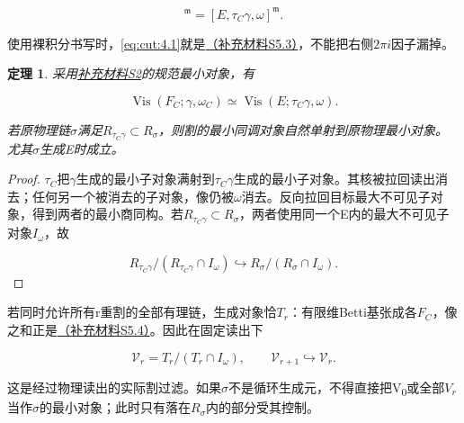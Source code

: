 \documentclass[11pt,a4paper,oneside]{ctexart}
\theoremstyle{cnplain}
\newtheorem{theorem}{定理}[section]
\theoremstyle{definition}
\theoremstyle{remark}
\numberwithin{equation}{section}
\newcommand{\otherref}[2]{\href{#1.pdf}{#2}}
\begin{document}
\begin{equation}
[F_C,\gamma,\omega_C]^{\mathfrak m}
       =[E,\tau_C\gamma,\omega]^{\mathfrak m}.         \label{eq:cut:4.1}
\end{equation}

使用裸积分书写时，\eqref{eq:cut:4.1}就是\otherref{feynman_periods_supplement}{（补充材料S5.3）}，不能把右侧\(2\pi i\)因子漏掉。

\begin{theorem}

\label{thm:cut:4.1} 采用\otherref{feynman_periods_supplement}{补充材料S2}的规范最小对象，有

\begin{equation}
\operatorname{Vis}(F_C;\gamma,\omega_C)
     \simeq\operatorname{Vis}(E;\tau_C\gamma,\omega).  \label{eq:cut:4.2}
\end{equation}

若原物理链\(\sigma \)满足\(R_{\tau _C\gamma }\subset R_\sigma \)，则割的最小同调对象自然单射到原物理最小对象。尤其\(\sigma \)生成E时成立。

\end{theorem}

\begin{proof}

\(\tau _C\)把\(\gamma \)生成的最小子对象满射到\(\tau _C\gamma \)生成的最小子对象。其核被拉回读出消去；任何另一个被消去的子对象，像仍被\(\omega \)消去。反向拉回目标最大不可见子对象，得到两者的最小商同构。若\(R_{\tau _C\gamma }\subset R_\sigma \)，两者使用同一个E内的最大不可见子对象\(I_\omega \)，故

\begin{equation}
R_{\tau _C\gamma }/(R_{\tau _C\gamma }\cap I_\omega)
       \hookrightarrow R_\sigma/(R_\sigma\cap I_\omega).
\end{equation}

\end{proof}

若同时允许所有r重割的全部有理链，生成对象恰\(T_r\)：有限维Betti基张成各\(F_C\)，像之和正是\otherref{feynman_periods_supplement}{（补充材料S5.4）}。因此在固定读出下

\begin{equation}
\mathcal V_r=T_r/(T_r\cap I_\omega),\qquad
 \mathcal V_{r+1}\hookrightarrow\mathcal V_r.          \label{eq:cut:4.3}
\end{equation}

这是经过物理读出的实际割过滤。如果\(\sigma \)不是循环生成元，不得直接把V\textsubscript{0}或全部\(V_r\)当作\(\sigma \)的最小对象；此时只有落在\(R_\sigma \)内的部分受其控制。
\end{document}

